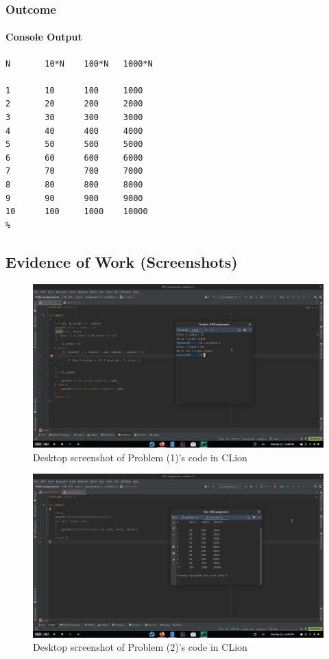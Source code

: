 \documentclass[a4paper,11pt]{article}
\theoremstyle{mytheor}
\theoremstyle{mytheor}
\begin{document}
\subsubsection{Outcome}
\paragraph{Console Output}
\begin{lstlisting}[escapechar=\%,style=output,numbers=none,label={list:fourth},title=Program's output to console in plaintext]
N       10*N    100*N   1000*N

1       10      100     1000
2       20      200     2000
3       30      300     3000
4       40      400     4000
5       50      500     5000
6       60      600     6000
7       70      700     7000
8       80      800     8000
9       90      900     9000
10      100     1000    10000
%
\end{lstlisting}
\newpage
\subsection{Evidence of Work (Screenshots)}
\begin{figure}[!h]
    \centering
    \includegraphics[width=\linewidth]{prob-1.png}
    \caption{Desktop screenshot of Problem (1)'s code in CLion}
\end{figure}
\begin{figure}[!h]
    \centering
    \includegraphics[width=\linewidth]{prob-2.png}
    \caption{Desktop screenshot of Problem (2)'s code in CLion}
\end{figure}
\newpage
\end{document}
